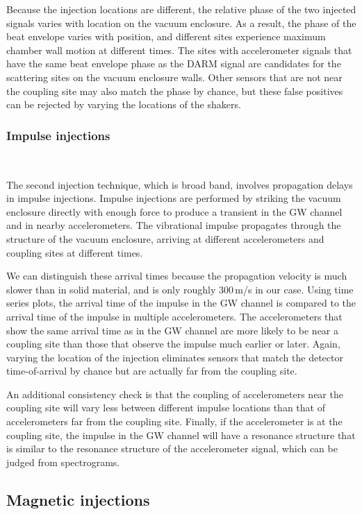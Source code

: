 Because the injection locations are different, the relative phase of the two injected signals varies with location on the vacuum enclosure.
As a result, the phase of the beat envelope varies with position, and different sites experience maximum chamber wall motion at different times.
The sites with accelerometer signals that have the same beat envelope phase as the \ac{DARM} signal are candidates for the scattering sites on the vacuum enclosure walls.
Other sensors that are not near the coupling site may also match the phase by chance, but these false positives can be rejected by varying the locations of the shakers.

\subsubsection{Impulse injections}~\label{sec:injections-vib-impulse}

The second injection technique, which is broad band, involves propagation delays in impulse injections.
Impulse injections are performed by striking the vacuum enclosure directly with enough force to produce a transient in the \ac{GW} channel and in nearby accelerometers.
The vibrational impulse propagates through the structure of the vacuum enclosure, arriving at different accelerometers and coupling sites at different times.

We can distinguish these arrival times because the propagation velocity is much slower than in solid material, and is only roughly 300\,m/s in our case. Using time series plots, the arrival time of the impulse in the \ac{GW} channel is compared to the arrival time of the impulse in multiple accelerometers.
The accelerometers that show the same arrival time as in the \ac{GW} channel are more likely to be near a coupling site than those that observe the impulse much earlier or later.
Again, varying the location of the injection eliminates sensors that match the detector time-of-arrival by chance but are actually far from the coupling site.

An additional consistency check is that the coupling of accelerometers near the coupling site will vary less between different impulse locations than that of accelerometers far from the coupling site.
Finally, if the accelerometer is at the coupling site, the impulse in the \ac{GW} channel will have a resonance structure that is similar to the resonance structure of the accelerometer signal, which can be judged from spectrograms.


\subsection{Magnetic injections}\label{sec:injections-magnetic}

